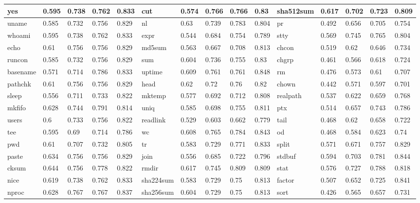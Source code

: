 \begin{table*}[h!]
\begin{center}
\begin{tabular}{ | l | l | l | l | l || l | l | l | l | l || l | l | l | l | l | }
	yes & 0.595 & 0.738 & 0.762 & 0.833 & cut & 0.574 & 0.766 & 0.766 & 0.83 & sha512sum & 0.617 & 0.702 & 0.723 & 0.809 \\ \hline
	uname & 0.585 & 0.732 & 0.756 & 0.829 & nl & 0.63 & 0.739 & 0.783 & 0.804 & pr & 0.492 & 0.656 & 0.705 & 0.754 \\ \hline
	whoami & 0.595 & 0.738 & 0.762 & 0.833 & expr & 0.544 & 0.684 & 0.754 & 0.789 & stty & 0.569 & 0.745 & 0.765 & 0.804 \\ \hline
	echo & 0.61 & 0.756 & 0.756 & 0.829 & md5sum & 0.563 & 0.667 & 0.708 & 0.813 & chcon & 0.519 & 0.62 & 0.646 & 0.734 \\ \hline
	runcon & 0.585 & 0.732 & 0.756 & 0.829 & sum & 0.604 & 0.736 & 0.755 & 0.83 & chgrp & 0.461 & 0.566 & 0.618 & 0.724 \\ \hline
	basename & 0.571 & 0.714 & 0.786 & 0.833 & uptime & 0.609 & 0.761 & 0.761 & 0.848 & rm & 0.476 & 0.573 & 0.61 & 0.707 \\ \hline
	pathchk & 0.61 & 0.756 & 0.756 & 0.829 & head & 0.62 & 0.72 & 0.76 & 0.82 & chown & 0.442 & 0.571 & 0.597 & 0.701 \\ \hline
	sleep & 0.556 & 0.711 & 0.733 & 0.822 & mktemp & 0.577 & 0.692 & 0.712 & 0.808 & realpath & 0.537 & 0.622 & 0.659 & 0.768 \\ \hline
	mkfifo & 0.628 & 0.744 & 0.791 & 0.814 & uniq & 0.585 & 0.698 & 0.755 & 0.811 & ptx & 0.514 & 0.657 & 0.743 & 0.786 \\ \hline
	users & 0.6 & 0.733 & 0.756 & 0.822 & readlink & 0.529 & 0.603 & 0.662 & 0.779 & tail & 0.468 & 0.62 & 0.658 & 0.722 \\ \hline
	tee & 0.595 & 0.69 & 0.714 & 0.786 & wc & 0.608 & 0.765 & 0.784 & 0.843 & od & 0.468 & 0.584 & 0.623 & 0.74 \\ \hline
	pwd & 0.61 & 0.707 & 0.732 & 0.805 & tr & 0.583 & 0.729 & 0.771 & 0.833 & split & 0.571 & 0.671 & 0.757 & 0.829 \\ \hline
	paste & 0.634 & 0.756 & 0.756 & 0.829 & join & 0.556 & 0.685 & 0.722 & 0.796 & stdbuf & 0.594 & 0.703 & 0.781 & 0.844 \\ \hline
	cksum & 0.644 & 0.756 & 0.778 & 0.822 & rmdir & 0.617 & 0.745 & 0.809 & 0.809 & stat & 0.576 & 0.727 & 0.788 & 0.818 \\ \hline
	nice & 0.619 & 0.738 & 0.762 & 0.833 & sha224sum & 0.583 & 0.729 & 0.75 & 0.813 & factor & 0.507 & 0.652 & 0.725 & 0.841 \\ \hline
	nproc & 0.628 & 0.767 & 0.767 & 0.837 & sha256sum & 0.604 & 0.729 & 0.75 & 0.813 & sort & 0.426 & 0.565 & 0.657 & 0.731 \\ \hline

\end{tabular}
\end{center}
\end{table*}
